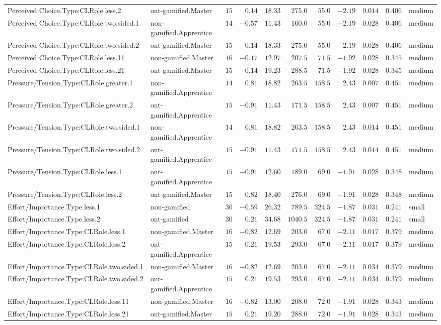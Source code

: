 \documentclass[6pt,a4paper]{article}
\begin{document}
\begin{landscape}
{\begin{longtable}{llrrrrrrrrl}
Perceived Choice.Type:CLRole.less.2&ont-gamified.Master&$15$&$ 0.14$&$18.33$&$ 275.0$&$ 55.0$&$-2.19$&$0.014$&$0.406$&medium\tabularnewline
Perceived Choice.Type:CLRole.two.sided.1&non-gamified.Apprentice&$14$&$-0.57$&$11.43$&$ 160.0$&$ 55.0$&$-2.19$&$0.028$&$0.406$&medium\tabularnewline
Perceived Choice.Type:CLRole.two.sided.2&ont-gamified.Master&$15$&$ 0.14$&$18.33$&$ 275.0$&$ 55.0$&$-2.19$&$0.028$&$0.406$&medium\tabularnewline
Perceived Choice.Type:CLRole.less.11&non-gamified.Master&$16$&$-0.17$&$12.97$&$ 207.5$&$ 71.5$&$-1.92$&$0.028$&$0.345$&medium\tabularnewline
Perceived Choice.Type:CLRole.less.21&ont-gamified.Master&$15$&$ 0.14$&$19.23$&$ 288.5$&$ 71.5$&$-1.92$&$0.028$&$0.345$&medium\tabularnewline
Pressure/Tension.Type:CLRole.greater.1&non-gamified.Apprentice&$14$&$ 0.81$&$18.82$&$ 263.5$&$158.5$&$ 2.43$&$0.007$&$0.451$&medium\tabularnewline
Pressure/Tension.Type:CLRole.greater.2&ont-gamified.Apprentice&$15$&$-0.91$&$11.43$&$ 171.5$&$158.5$&$ 2.43$&$0.007$&$0.451$&medium\tabularnewline
Pressure/Tension.Type:CLRole.two.sided.1&non-gamified.Apprentice&$14$&$ 0.81$&$18.82$&$ 263.5$&$158.5$&$ 2.43$&$0.014$&$0.451$&medium\tabularnewline
Pressure/Tension.Type:CLRole.two.sided.2&ont-gamified.Apprentice&$15$&$-0.91$&$11.43$&$ 171.5$&$158.5$&$ 2.43$&$0.014$&$0.451$&medium\tabularnewline
Pressure/Tension.Type:CLRole.less.1&ont-gamified.Apprentice&$15$&$-0.91$&$12.60$&$ 189.0$&$ 69.0$&$-1.91$&$0.028$&$0.348$&medium\tabularnewline
Pressure/Tension.Type:CLRole.less.2&ont-gamified.Master&$15$&$ 0.82$&$18.40$&$ 276.0$&$ 69.0$&$-1.91$&$0.028$&$0.348$&medium\tabularnewline
Effort/Importance.Type.less.1&non-gamified&$30$&$-0.59$&$26.32$&$ 789.5$&$324.5$&$-1.87$&$0.031$&$0.241$&small\tabularnewline
Effort/Importance.Type.less.2&ont-gamified&$30$&$ 0.21$&$34.68$&$1040.5$&$324.5$&$-1.87$&$0.031$&$0.241$&small\tabularnewline
Effort/Importance.Type:CLRole.less.1&non-gamified.Master&$16$&$-0.82$&$12.69$&$ 203.0$&$ 67.0$&$-2.11$&$0.017$&$0.379$&medium\tabularnewline
Effort/Importance.Type:CLRole.less.2&ont-gamified.Apprentice&$15$&$ 0.21$&$19.53$&$ 293.0$&$ 67.0$&$-2.11$&$0.017$&$0.379$&medium\tabularnewline
Effort/Importance.Type:CLRole.two.sided.1&non-gamified.Master&$16$&$-0.82$&$12.69$&$ 203.0$&$ 67.0$&$-2.11$&$0.034$&$0.379$&medium\tabularnewline
Effort/Importance.Type:CLRole.two.sided.2&ont-gamified.Apprentice&$15$&$ 0.21$&$19.53$&$ 293.0$&$ 67.0$&$-2.11$&$0.034$&$0.379$&medium\tabularnewline
Effort/Importance.Type:CLRole.less.11&non-gamified.Master&$16$&$-0.82$&$13.00$&$ 208.0$&$ 72.0$&$-1.91$&$0.028$&$0.343$&medium\tabularnewline
Effort/Importance.Type:CLRole.less.21&ont-gamified.Master&$15$&$ 0.21$&$19.20$&$ 288.0$&$ 72.0$&$-1.91$&$0.028$&$0.343$&medium\tabularnewline

\end{longtable}}
\end{landscape}
\end{document}
